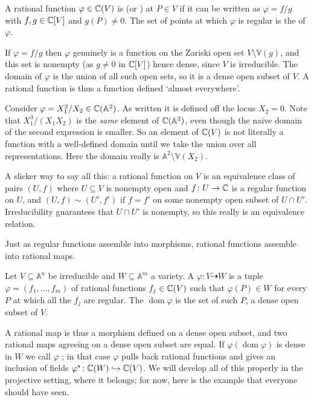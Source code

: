 \documentclass[a4paper]{scrartcl}
\newcommand{\A}{\mathbb{A}}
\newcommand{\V}{\mathbb{V}}
\newcommand{\dto}{\dashrightarrow}
\DeclareMathOperator{\dom}{dom}
\begin{document}
\begin{definition}
	A rational function $\varphi \in \mathbb{C}(V)$ is  (or ) at $P \in V$ if it can be written as $\varphi = f/g$ with $f,g \in \mathbb{C}[V]$ and $g(P) \neq 0$. The set of points at which $\varphi$ is regular is the  of $\varphi$.
\end{definition}

If $\varphi = f/g$ then $\varphi$ genuinely is a function on the Zariski open set $V \setminus \V(g)$, and this set is nonempty (as $g \neq 0$ in $\mathbb{C}[V]$) hence dense, since $V$ is irreducible. The domain of $\varphi$ is the union of all such open sets, so it is a dense open subset of $V$. A rational function is thus a function defined `almost everywhere'.

\begin{example}
	Consider $\varphi = X_1^2/X_2 \in \C(\A^2)$. As written it is defined off the locus $X_2 = 0$. Note that $X_1^3/(X_1X_2)$ is the \emph{same} element of $\C(\A^2)$, even though the naive domain of the second expression is smaller. So an element of $\mathbb{C}(V)$ is not literally a function with a well-defined domain until we take the union over all representations. Here the domain really is $\A^2 \setminus \V(X_2)$.
\end{example}

\begin{remark}
	A slicker way to say all this: a rational function on $V$ is an equivalence class of pairs $(U,f)$ where $U \subseteq V$ is nonempty open and $f \colon U \to \mathbb{C}$ is a regular function on $U$, and $(U,f) \sim (U',f')$ if $f = f'$ on some nonempty open subset of $U \cap U'$. Irreducibility guarantees that $U \cap U'$ is nonempty, so this really is an equivalence relation.
\end{remark}

Just as regular functions assemble into morphisms, rational functions assemble into rational maps.

\begin{definition}
	Let $V \subseteq \A^n$ be irreducible and $W \subseteq \A^m$ a variety. A  $\varphi \colon V \dto W$ is a tuple $\varphi = (f_1,\dots,f_m)$ of rational functions $f_j \in \mathbb{C}(V)$ such that $\varphi(P) \in W$ for every $P$ at which all the $f_j$ are regular. The  $\dom\varphi$ is the set of such $P$, a dense open subset of $V$.
\end{definition}

A rational map is thus a morphism defined on a dense open subset, and two rational maps agreeing on a dense open subset are equal. If $\varphi(\dom\varphi)$ is dense in $W$ we call $\varphi$ ; in that case $\varphi$ pulls back rational functions and gives an inclusion of fields $\varphi^\star \colon \mathbb{C}(W)\hookrightarrow\mathbb{C}(V)$. We will develop all of this properly in the projective setting, where it belongs; for now, here is the example that everyone should have seen.
\end{document}
